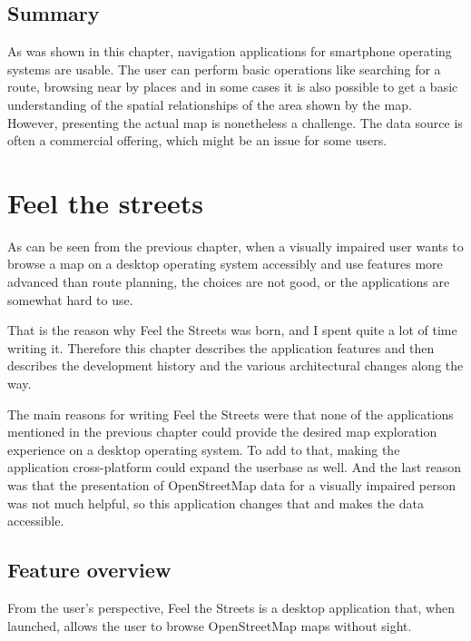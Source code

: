 \documentclass[nolof,digital]{fithesis3}
\begin{document}
\section{Summary}
As was shown in this chapter, navigation applications for smartphone operating systems are usable. The user can perform basic operations like searching for a route, browsing near by places and in some cases it is also possible to get a basic understanding of the spatial relationships of the area shown by the map. However, presenting the actual map is nonetheless a challenge. The data source is often a commercial offering, which might be an issue for some users.
\chapter{Feel the streets} \label{ref:fts}
As can be seen from the previous chapter, when a visually impaired user wants to browse a map on a desktop operating system accessibly and use features more advanced than route planning, the choices are not good, or the applications are somewhat hard to use.

That is the reason why Feel the Streets was born, and I spent quite a lot of time writing it. Therefore this chapter describes the application features and then describes the development history and the various architectural changes along the way.

The main reasons for writing Feel the Streets were that none of the applications mentioned in the previous chapter could provide the desired map exploration experience on a desktop operating system. To add to that, making the application cross-platform could expand the userbase as well. And the last reason was that the presentation of OpenStreetMap data for a visually impaired person was not much helpful, so this application changes that and makes the data accessible.
\section{Feature overview}
From the user's perspective, Feel the Streets is a desktop application that, when launched, allows the user to browse OpenStreetMap maps without sight.
\end{document}
